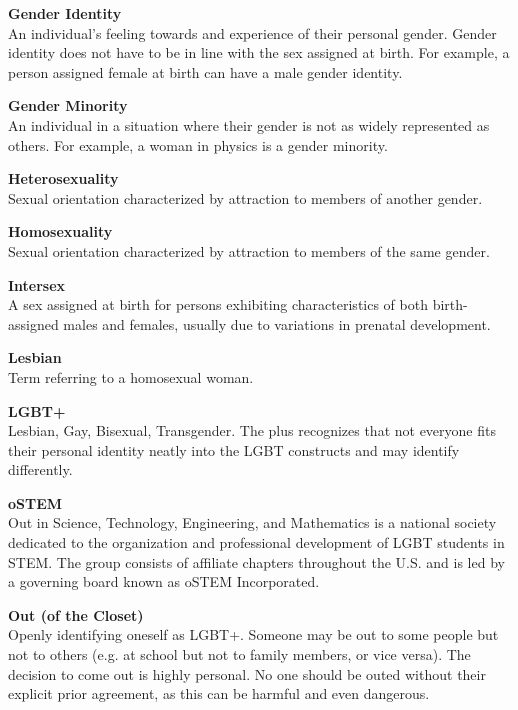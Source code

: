 \begin{titlepage}
\noindent\textbf{Gender Identity}\\
An individual's feeling towards and experience of their personal gender. Gender identity does not have to be in line with the sex assigned at birth. For example, a person assigned female at birth can have a male gender identity.\vspace*{\baselineskip}

\noindent\textbf{Gender Minority}\\
An individual in a situation where their gender is not as widely represented as others. For example, a woman in physics is a gender minority.\vspace*{\baselineskip}

\noindent\textbf{Heterosexuality}\\
Sexual orientation characterized by attraction to members of another gender.\vspace*{\baselineskip}

\noindent\textbf{Homosexuality}\\
Sexual orientation characterized by attraction to members of the same gender.\vspace*{\baselineskip}

\noindent\textbf{Intersex}\\
A sex assigned at birth for persons exhibiting characteristics of both birth-assigned males and females, usually due to variations in prenatal development.\vspace*{\baselineskip}

\noindent\textbf{Lesbian}\\
Term referring to a homosexual woman.\vspace*{\baselineskip}

\noindent\textbf{LGBT+}\\
Lesbian, Gay, Bisexual, Transgender. The plus recognizes that not everyone fits their personal identity neatly into the LGBT constructs and may identify differently.\vspace*{\baselineskip}

\noindent\textbf{oSTEM}\\
Out in Science, Technology, Engineering, and Mathematics is a national society dedicated to the organization and professional development of LGBT students in STEM. The group consists of affiliate chapters throughout the U.S. and is led by a governing board known as oSTEM Incorporated.\vspace*{\baselineskip}

\noindent\textbf{Out (of the Closet)}\\
Openly identifying oneself as LGBT+. Someone may be out to some people but not to others (e.g. at school but not to family members, or vice versa). The decision to come out is highly personal. No one should be outed without their explicit prior agreement, as this can be harmful and even dangerous.\vspace*{\baselineskip}


\end{titlepage}
